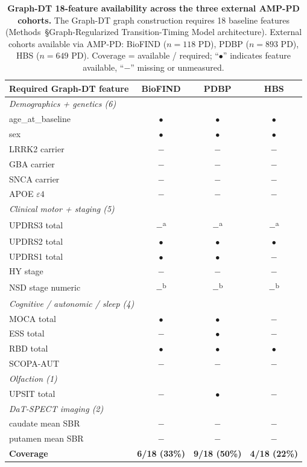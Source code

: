 \documentclass[11pt]{article}
\begin{document}
\begin{table}[h!]
\centering
\caption{\textbf{Graph-DT 18-feature availability across the three external AMP-PD cohorts.} The Graph-DT graph construction requires 18 baseline features (Methods~\S Graph-Regularized Transition-Timing Model architecture). External cohorts available via AMP-PD: BioFIND ($n{=}118$ PD), PDBP ($n{=}893$ PD), HBS ($n{=}649$ PD). Coverage = available / required; ``$\bullet$'' indicates feature available, ``$-$'' missing or unmeasured.}
\label{tab:s_wsp316_external}
\begin{tabular}{lccc}
\toprule
\textbf{Required Graph-DT feature} & \textbf{BioFIND} & \textbf{PDBP} & \textbf{HBS} \\
\midrule
\multicolumn{4}{l}{\textit{Demographics + genetics (6)}} \\
age\_at\_baseline   & $\bullet$ & $\bullet$ & $\bullet$ \\
sex                 & $\bullet$ & $\bullet$ & $\bullet$ \\
LRRK2 carrier       & $-$ & $-$ & $-$ \\
GBA carrier         & $-$ & $-$ & $-$ \\
SNCA carrier        & $-$ & $-$ & $-$ \\
APOE $\varepsilon4$ & $-$ & $-$ & $-$ \\
\midrule
\multicolumn{4}{l}{\textit{Clinical motor + staging (5)}} \\
UPDRS3 total        & $-$\textsuperscript{a} & $-$\textsuperscript{a} & $-$\textsuperscript{a} \\
UPDRS2 total        & $\bullet$ & $\bullet$ & $\bullet$ \\
UPDRS1 total        & $\bullet$ & $\bullet$ & $-$ \\
HY stage            & $-$ & $-$ & $-$ \\
NSD stage numeric   & $-$\textsuperscript{b} & $-$\textsuperscript{b} & $-$\textsuperscript{b} \\
\midrule
\multicolumn{4}{l}{\textit{Cognitive / autonomic / sleep (4)}} \\
MOCA total          & $\bullet$ & $\bullet$ & $-$ \\
ESS total           & $-$ & $\bullet$ & $-$ \\
RBD total           & $\bullet$ & $\bullet$ & $\bullet$ \\
SCOPA-AUT           & $-$ & $-$ & $-$ \\
\midrule
\multicolumn{4}{l}{\textit{Olfaction (1)}} \\
UPSIT total         & $-$ & $\bullet$ & $-$ \\
\midrule
\multicolumn{4}{l}{\textit{DaT-SPECT imaging (2)}} \\
caudate mean SBR    & $-$ & $-$ & $-$ \\
putamen mean SBR    & $-$ & $-$ & $-$ \\
\midrule
\textbf{Coverage}   & \textbf{6/18 (33\%)} & \textbf{9/18 (50\%)} & \textbf{4/18 (22\%)} \\
\bottomrule
\end{tabular}
\end{table}
\end{document}
